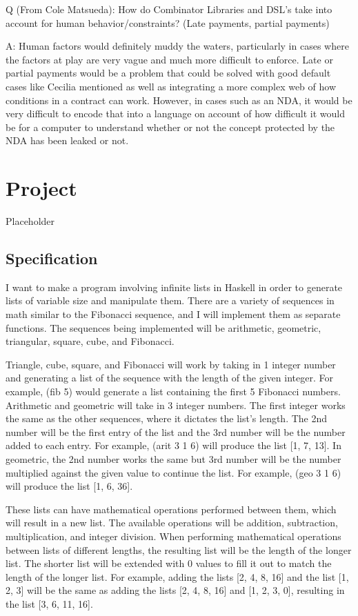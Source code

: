 \documentclass{article}
\theoremstyle{theorem}
\theoremstyle{definition}
\theoremstyle{remark}
\begin{document}
\medskip\noindent
Q (From Cole Matsueda): How do Combinator Libraries and DSL's take into account for human behavior/constraints? (Late payments,  partial payments)

\medskip\noindent
A: Human factors would definitely muddy the waters, particularly in cases where the factors at play are very vague and much more difficult to enforce. Late or partial payments would be a problem that could be solved with good default cases like Cecilia mentioned as well as integrating a more complex web of how conditions in a contract can work. However, in cases such as an NDA, it would be very difficult to encode that into a language on account of how difficult it would be for a computer to understand whether or not the concept protected by the NDA has been leaked or not.

\section{Project}

Placeholder

\subsection{Specification}
I want to make a program involving infinite lists in Haskell in order to generate lists of variable size and manipulate them. There are a variety of sequences in math similar to the Fibonacci sequence, and I will implement them as separate functions. The sequences being implemented will be arithmetic, geometric, triangular, square, cube, and Fibonacci.

\medskip\noindent
Triangle, cube, square, and Fibonacci will work by taking in 1 integer number and generating a list of the sequence with the length of the given integer. For example, (fib 5) would generate a list containing the first 5 Fibonacci numbers. Arithmetic and geometric will take in 3 integer numbers. The first integer works the same as the other sequences, where it dictates the list's length. The 2nd number will be the first entry of the list and the 3rd number will be the number added to each entry. For example, (arit 3 1 6) will produce the list [1, 7, 13]. In geometric, the 2nd number works the same but 3rd number will be the number multiplied against the given value to continue the list. For example, (geo 3 1 6) will produce the list [1, 6, 36].

\medskip\noindent
These lists can have mathematical operations performed between them, which will result in a new list. The available operations will be addition, subtraction, multiplication, and integer division. When performing mathematical operations between lists of different lengths, the resulting list will be the length of the longer list. The shorter list will be extended with 0 values to fill it out to match the length of the longer list. For example, adding the lists [2, 4, 8, 16] and the list [1, 2, 3] will be the same as adding the lists [2, 4, 8, 16] and [1, 2, 3, 0], resulting in the list [3, 6, 11, 16].
\end{document}
